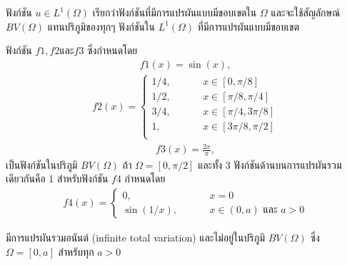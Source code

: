 \hspace{1cm}ฟังก์ชัน $u \in L^1 (\Omega)$ เรียกว่าฟังก์ชันที่มีการแปรผันแบบมีขอบเขตใน $\Omega$ และจะใช้สัญลักษณ์ $BV(\Omega)$ แทนปริภูมิของทุกๆ ฟังก์ชันใน $L^1(\Omega)$ ที่มีการแปรผันแบบมีขอบเขต
\begin{Example}
    ฟังก์ชัน $f1, f2 \text{และ} f3 $ ซึ่งกำหนดโดย
    \begin{align}
        f1(x) = \sin{(x)},
    \end{align}
    \begin{align}
        f2(x) = \left\{
            \begin{array}{ll}
              1/4, \hspace{1cm}  &x \in [0,\pi/8] \\
              1/2, \hspace{1cm}  &x \in [\pi/8,\pi/4] \\
              3/4, \hspace{1cm}   &x \in [\pi/4,3\pi/8] \\
              1,   \hspace{1cm} &x \in [3\pi/8,\pi/2] \\
            \end{array}
          \right.
    \end{align}
    \begin{align}
        f3(x) = \frac{2x}{\pi},
    \end{align}
    เป็นฟังก์ชันในปริภูมิ $BV(\Omega)$ ถ้า $\Omega = [0, \pi/2]$ และทั้ง 3 ฟังก์ชันด้านบนการแปรผันรวมเดียวกันคือ 1 สำหรับฟังก์ชัน $f4$ กำหนดโดย
    \begin{align}
        f4(x) = \left\{ 
            \begin{array}{ll}
                0,  \hspace{1cm}  &  x = 0 \\
                \sin (1/x),  \hspace{1cm}  & x \in (0,a) \text{ และ } a > 0
            \end{array}
        \right.
    \end{align}
    
    มีการแปรผันรวมอนันต์ (infinite total variation) และไม่อยู่ในปริภูมิ $BV(\Omega)$ ซึ่ง $\Omega = [0,a]$ สำหรับทุก $a > 0$
    
\end{Example}
